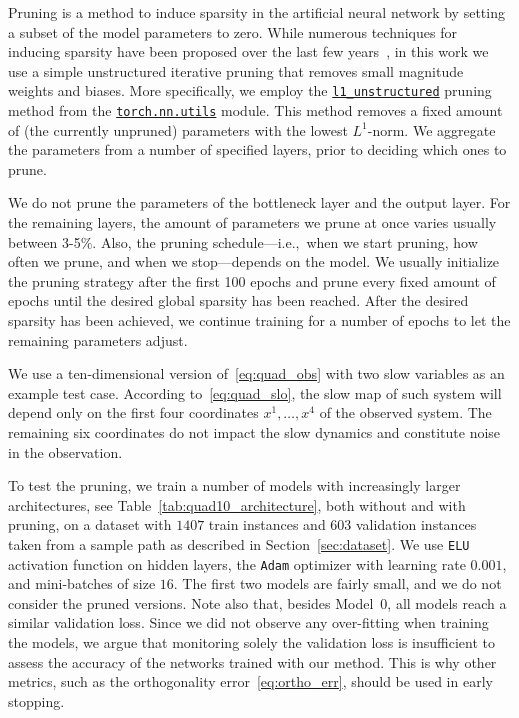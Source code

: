 \documentclass{article}
\begin{document}
Pruning is a method to induce sparsity in the artificial neural network by setting a subset of the model parameters to zero.
While numerous techniques for inducing sparsity have been proposed over the last few years~\cite{gale_state_2019}, in this work we use a simple unstructured iterative pruning that removes small magnitude weights and biases. More specifically, we employ the \href{https://pytorch.org/docs/stable/generated/torch.nn.utils.prune.l1_unstructured.html}{\texttt{l1\_unstructured}} pruning method from the \href{https://pytorch.org/docs/stable/nn.html#utilities}{\texttt{torch.nn.utils}} module. This method removes a fixed amount of (the currently unpruned) parameters with the lowest $L^1$-norm. We aggregate the parameters from a number of specified layers, prior to deciding which ones to prune.

We do not prune the parameters of the bottleneck layer and the output layer. For the remaining layers, the amount of parameters we prune at once varies usually between 3-5\%. Also, the pruning schedule---i.e.,~when we start pruning, how often we prune, and when we stop---depends on the model. We usually initialize the pruning strategy after the first 100 epochs and prune every fixed amount of epochs until the desired global sparsity has been reached. After the desired sparsity has been achieved, we continue training for a number of epochs to let the remaining parameters adjust.

We use a ten-dimensional version of~\eqref{eq:quad_obs} with two slow variables as an example test case. According to~\eqref{eq:quad_slo}, the slow map of such system will depend only on the first four coordinates $x^1,\dots,x^4$ of the observed system. The remaining six coordinates do not impact the slow dynamics and constitute noise in the observation.

To test the pruning, we train a number of models with increasingly larger architectures, see Table~\ref{tab:quad10_architecture}, both without and with pruning, on a dataset with $1407$ train instances and $603$ validation instances taken from a sample path as described in Section~\ref{sec:dataset}. We use \texttt{ELU} activation function on hidden layers, the \texttt{Adam} optimizer with learning rate $0.001$, and mini-batches of size $16$. The first two models are fairly small, and we do not consider the pruned versions. Note also that, besides Model~0, all models reach a similar validation loss. Since we did not observe any over-fitting when training the models, we argue that monitoring solely the validation loss is insufficient to assess the accuracy of the networks trained with our method. This is why other metrics, such as the orthogonality error~\eqref{eq:ortho_err}, should be used in early stopping.
\end{document}
